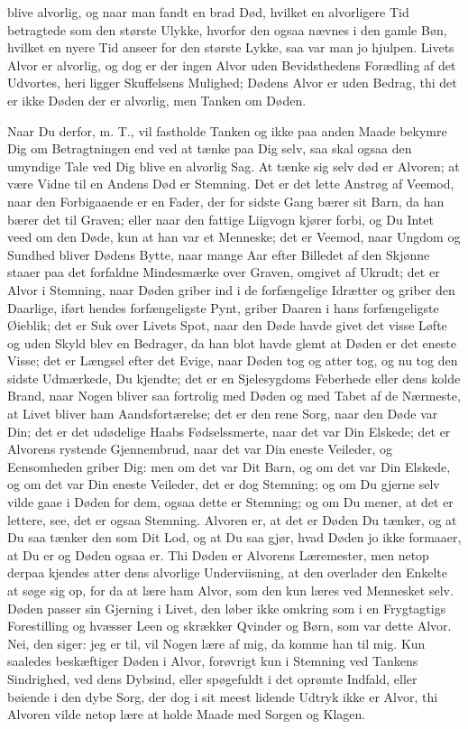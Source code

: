 \documentclass[12pt,a4paper]{article}
\begin{document}
blive alvorlig, og naar man fandt en brad Død, hvilket en alvorligere Tid betragtede som den største Ulykke, hvorfor den ogsaa nævnes i den gamle Bøn, hvilket en nyere Tid anseer for den største Lykke, saa var man jo hjulpen. Livets Alvor er alvorlig, og dog er der ingen Alvor uden Bevidsthedens Forædling af det Udvortes, heri ligger Skuffelsens Mulighed; Dødens Alvor er uden Bedrag, thi det er ikke Døden der er alvorlig, men Tanken om Døden.

Naar Du derfor, m. T., vil fastholde Tanken og ikke paa anden Maade bekymre Dig om Betragtningen end ved at tænke paa Dig selv, saa skal ogsaa den umyndige Tale ved Dig blive en alvorlig Sag. At tænke sig selv død er Alvoren; at være Vidne til en Andens Død er Stemning. Det er det lette Anstrøg af Veemod, naar den Forbigaaende er en Fader, der for sidste Gang bærer sit Barn, da han bærer det til Graven; eller naar den fattige Liigvogn kjører forbi, og Du Intet veed om den Døde, kun at han var et Menneske; det er Veemod, naar Ungdom og Sundhed bliver Dødens Bytte, naar mange Aar efter Billedet af den Skjønne staaer paa det forfaldne Mindesmærke over Graven, omgivet af Ukrudt; det er Alvor i Stemning, naar Døden griber ind i de forfængelige Idrætter og griber den Daarlige, iført hendes forfængeligste Pynt, griber Daaren i hans forfængeligste Øieblik; det er Suk over Livets Spot, naar den Døde havde givet det visse Løfte og uden Skyld blev en Bedrager, da han blot havde glemt at Døden er det eneste Visse; det er Længsel efter det Evige, naar Døden tog og atter tog, og nu tog den sidste Udmærkede, Du kjendte; det er en Sjelesygdoms Feberhede eller dens kolde Brand, naar Nogen bliver saa fortrolig med Døden og med Tabet af de Nærmeste, at Livet bliver ham Aandsfortærelse; det er den rene Sorg, naar den Døde var Din; det er det udødelige Haabs Fødselssmerte, naar det var Din Elskede; det er Alvorens rystende Gjennembrud, naar det var Din eneste Veileder, og Eensomheden griber Dig: men om det var Dit Barn, og om det var Din Elskede, og om det var Din eneste Veileder, det er dog Stemning; og om Du gjerne selv vilde gaae i Døden for dem, ogsaa dette er Stemning; og om Du mener, at det er lettere, see, det er ogsaa Stemning. Alvoren er, at det er Døden Du tænker, og at Du saa tænker den som Dit Lod, og at Du saa gjør, hvad Døden jo ikke formaaer, at Du er og Døden ogsaa er. Thi Døden er Alvorens Læremester, men netop derpaa kjendes atter dens alvorlige Underviisning, at den overlader den Enkelte at søge sig op, for da at lære ham Alvor, som den kun læres ved Mennesket selv. Døden passer sin Gjerning i Livet, den løber ikke omkring som i en Frygtagtigs Forestilling og hvæsser Leen og skrækker Qvinder og Børn, som var dette Alvor. Nei, den siger: jeg er til, vil Nogen lære af mig, da komme han til mig. Kun saaledes beskæftiger Døden i Alvor, forøvrigt kun i Stemning ved Tankens Sindrighed, ved dens Dybsind, eller spøgefuldt i det oprømte Indfald, eller bøiende i den dybe Sorg, der dog i sit meest lidende Udtryk ikke er Alvor, thi Alvoren vilde netop lære at holde Maade med Sorgen og Klagen.
\end{document}
